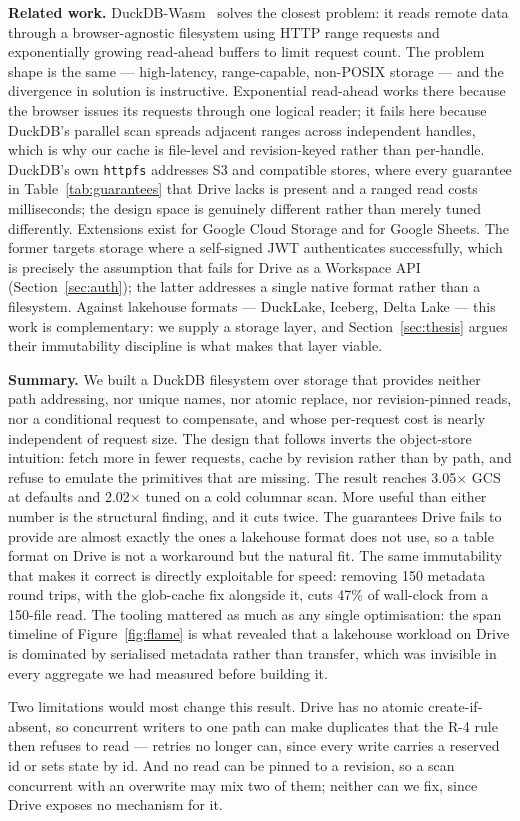 \documentclass[sigconf, nonacm]{acmart}
\begin{document}
\textbf{Related work.}
DuckDB-Wasm~\cite{duckdbwasm} solves the closest problem: it reads remote data
through a browser-agnostic filesystem using HTTP range requests and
exponentially growing read-ahead buffers to limit request count. The problem
shape is the same --- high-latency, range-capable, non-POSIX storage --- and the
divergence in solution is instructive. Exponential read-ahead works there
because the browser issues its requests through one logical reader; it fails
here because DuckDB's parallel scan spreads adjacent ranges across independent
handles, which is why our cache is file-level and revision-keyed rather than
per-handle. DuckDB's own \texttt{httpfs} addresses S3 and compatible stores,
where every guarantee in Table~\ref{tab:guarantees} that Drive lacks is
present and a ranged read costs milliseconds; the design space is genuinely
different rather than merely tuned differently. Extensions exist for Google
Cloud Storage and for Google Sheets. The former targets storage where a
self-signed JWT authenticates successfully, which is precisely the assumption
that fails for Drive as a Workspace API (Section~\ref{sec:auth}); the latter
addresses a single native format rather than a filesystem. Against
lakehouse formats --- DuckLake, Iceberg, Delta Lake --- this work is
complementary: we supply a storage layer, and Section~\ref{sec:thesis} argues
their immutability discipline is what makes that layer viable.

\textbf{Summary.}
We built a DuckDB filesystem over storage that provides neither path
addressing, nor unique names, nor atomic replace, nor revision-pinned reads,
nor a conditional request to compensate, and whose per-request cost is nearly
independent of request size. The design
that follows inverts the object-store intuition: fetch more in fewer requests,
cache by revision rather than by path, and refuse to emulate the primitives
that are missing. The result reaches 3.05$\times$ GCS at defaults and
2.02$\times$ tuned on a cold columnar scan. More useful than either number is
the structural finding, and it cuts twice. The guarantees Drive fails to
provide are almost exactly the ones a lakehouse format does not use, so a table
format on Drive is not a workaround but the natural fit. The same immutability
that makes it correct is directly exploitable for speed: removing 150 metadata
round trips, with the glob-cache fix alongside it, cuts 47\% of wall-clock
from a 150-file read. The
tooling mattered as much as any single optimisation: the span timeline of
Figure~\ref{fig:flame} is what revealed that a lakehouse workload on Drive is
dominated by serialised metadata rather than transfer, which was invisible in
every aggregate we had measured before building it.

Two limitations would most change this result. Drive has no atomic
create-if-absent, so concurrent writers to one path can make duplicates that
the R-4 rule then refuses to read --- retries no longer can, since every write
carries a reserved id or sets state by id. And no read can be pinned to a
revision, so a scan concurrent with an overwrite may mix two of them; neither
can we fix, since Drive exposes no mechanism for it.

\balance


\end{document}
